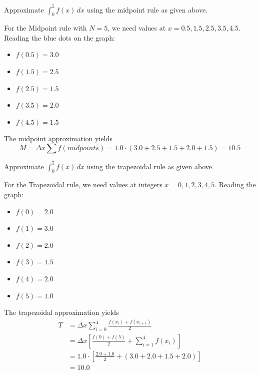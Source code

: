 \documentclass[12pt,addpoints]{exam}
\renewenvironment{solution}{\begin{solutionstyle}}{\end{solutionstyle}}
\begin{document}
\begin{questions}
\begin{parts}
    \bonuspart[2] Approximate $\int_{0}^{5} f(x) \, dx$ using the midpoint rule as given above.
    \begin{solution}
        For the Midpoint rule with $N=5$, we need values at $x = 0.5, 1.5, 2.5, 3.5, 4.5$. Reading the blue dots on the graph:
        \begin{itemize}
            \item $f(0.5) = 3.0$
            \item $f(1.5) = 2.5$
            \item $f(2.5) = 1.5$
            \item $f(3.5) = 2.0$
            \item $f(4.5) = 1.5$
        \end{itemize}
        The midpoint approximation yields
        \begin{equation}
            M = \Delta x \sum f(midpoints) = 1.0 \cdot (3.0 + 2.5 + 1.5 + 2.0 + 1.5) = \mathbf{10.5}
        \end{equation}
    \end{solution}

    \bonuspart[2] Approximate $\int_{0}^{5} f(x) \, dx$ using the trapezoidal rule as given above.
    \begin{solution}
        For the Trapezoidal rule, we need values at integers $x=0, 1, 2, 3, 4, 5$. Reading the graph:
        \begin{itemize}
            \item $f(0)=2.0$
            \item $f(1)=3.0$
            \item $f(2)=2.0$
            \item $f(3)=1.5$
            \item $f(4)=2.0$
            \item $f(5)=1.0$
        \end{itemize}
        The trapezoidal approximation yields
        \begin{equation}
            \begin{aligned}
                T &= \Delta x \sum_{i=0}^{4} \frac{f(x_i) + f(x_{i+1})}{2} \\
                &= \Delta x \left[ \frac{f(0)+f(5)}{2} + \sum_{i=1}^{4} f(x_i) \right] \\
                &= 1.0 \cdot \left[ \frac{2.0 + 1.0}{2} + (3.0 + 2.0 + 1.5 + 2.0) \right] \\
                &= \mathbf{10.0}
            \end{aligned}
        \end{equation}
    \end{solution}
\end{parts}


\end{questions}
\end{document}
